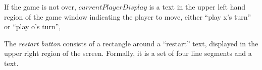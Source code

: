 \documentclass{led_doc}
\begin{document}
\begin{ledDef}
\end{ledDef}

\begin{ledDef}
\end{ledDef}

\begin{ledCmnt}
If the game is not over, $currentPlayerDisplay$ is a text in the upper left hand
region of the game window indicating the player to move, either ``play x's turn'' or
``play o's turn'',
\end{ledCmnt}

\begin{ledDef}
\end{ledDef}

\begin{ledCmnt}
The {\em restart button} consists of a rectangle around a ``restart'' text,
displayed in the upper right region of the screen. Formally, it is a set of
four line segments and a text.
\end{ledCmnt}

\begin{ledDef}
\end{ledDef}

\begin{ledDef}
\end{ledDef}

\begin{ledDef}
\end{ledDef}

\begin{ledDef}
\end{ledDef}

\begin{ledDef}
\end{ledDef}

\begin{ledDef}
\end{ledDef}
\end{document}
